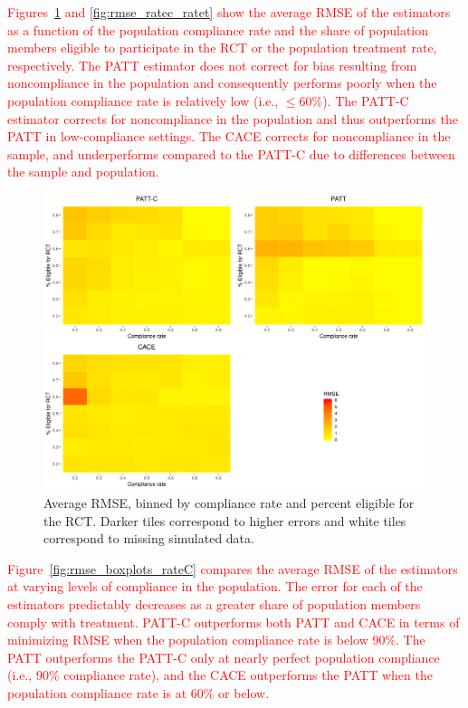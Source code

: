 \documentclass[hidelinks,12pt]{article}
\begin{document}
\textcolor{red}{Figures~\ref{fig:rmse_ratec_rates} and \ref{fig:rmse_ratec_ratet} show the average RMSE of the estimators as a function of the population compliance rate and the share of population members eligible to participate in the RCT or the population treatment rate, respectively. The PATT estimator does not correct for bias resulting from noncompliance in the population and consequently performs poorly when the population compliance rate is relatively low (i.e., $\leq 60\%$). The PATT-C estimator corrects for noncompliance in the population and thus outperforms the PATT in low-compliance settings. The CACE corrects for noncompliance in the sample, and underperforms compared to the PATT-C due to differences between the sample and population.}

\begin{figure}[htbp]
	\begin{center}
		\includegraphics[width = 1\textwidth]{rmse_ratec_rates.png}
		\caption{Average RMSE, binned by compliance rate and percent eligible for the RCT. Darker tiles correspond to higher errors and white tiles correspond to missing simulated data.\label{fig:rmse_ratec_rates}}
	\end{center}
\end{figure}

\textcolor{red}{Figure~\ref{fig:rmse_boxplots_rateC} compares the average RMSE of the estimators at varying levels of compliance in the population. The error for each of the estimators predictably decreases as a greater share of population members comply with treatment. PATT-C outperforms both PATT and CACE in terms of minimizing RMSE when the population compliance rate is below 90\%. The PATT outperforms the PATT-C only at nearly perfect population compliance (i.e., 90\% compliance rate), and the CACE outperforms the PATT when the population compliance rate is at 60\% or below.} 
\end{document}
